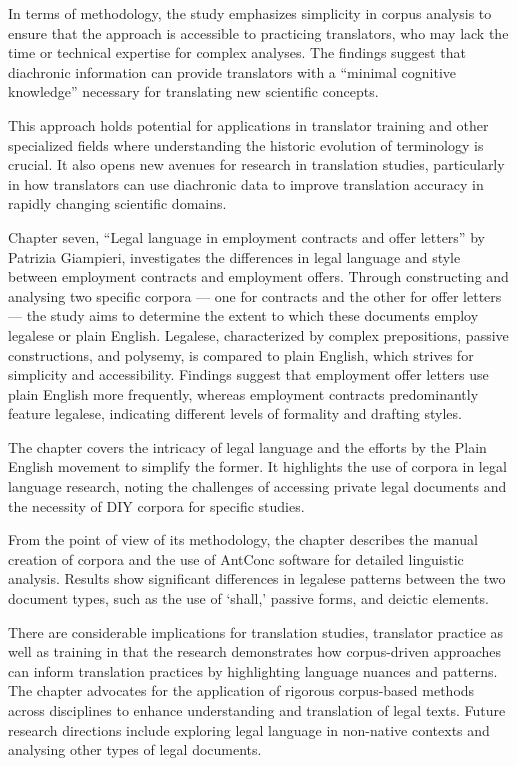 \documentclass[output=paper]{langscibook}
\begin{document}
In terms of methodology, the study emphasizes simplicity in corpus analysis to ensure that the approach is accessible to practicing translators, who may lack the time or technical expertise for complex analyses. The findings suggest that diachronic information can provide translators with a “minimal cognitive knowledge” necessary for translating new scientific concepts.

This approach holds potential for applications in translator training and other specialized fields where understanding the historic evolution of terminology is crucial. It also opens new avenues for research in translation studies, particularly in how translators can use diachronic data to improve translation accuracy in rapidly changing scientific domains.

Chapter seven, “Legal language in employment contracts and offer letters” by Patrizia Giampieri, investigates the differences in legal language and style between employment contracts and employment offers. Through constructing and analysing two specific corpora — one for contracts and the other for offer letters — the study aims to determine the extent to which these documents employ legalese or plain English. Legalese, characterized by complex prepositions, passive constructions, and polysemy, is compared to plain English, which strives for simplicity and accessibility. Findings suggest that employment offer letters use plain English more frequently, whereas employment contracts predominantly feature legalese, indicating different levels of formality and drafting styles.

The chapter covers the intricacy of legal language and the efforts by the Plain English movement to simplify the former. It highlights the use of corpora in legal language research, noting the challenges of accessing private legal documents and the necessity of DIY corpora for specific studies.

From the point of view of its methodology, the chapter describes the manual creation of corpora and the use of AntConc software for detailed linguistic analysis. Results show significant differences in legalese patterns between the two document types, such as the use of ‘shall,’ passive forms, and deictic elements.

There are considerable implications for translation studies, translator practice as well as training in that the research demonstrates how corpus-driven approaches can inform translation practices by highlighting language nuances and patterns. The chapter advocates for the application of rigorous corpus-based methods across disciplines to enhance understanding and translation of legal texts. Future research directions include exploring legal language in non-native contexts and analysing other types of legal documents.
\end{document}
